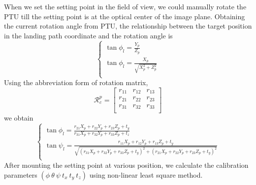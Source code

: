 \documentclass[journal,article,submit,moreauthors,pdftex,10pt,a4paper]{mdpi}
\begin{document}
When we set the setting point in the field of view, we could manually rotate the PTU till the setting point is at the optical center of the image plane. Obtaining the current rotation angle from PTU, the relationship between the target position in the landing path coordinate and the rotation angle is
\begin{equation}
\left\{ \begin{gathered}
\tan \phi_l = \frac{Y_p}{Z_p} \\
\tan \phi_l = \frac{X_p}{\sqrt{X_p^2+Z_p^2} }\\
\end{gathered}  \right.
\end{equation}
Using the abbreviation form of rotation matrix, 
\begin{equation}
\mathcal{R}_c^p = \begin{bmatrix}
r_{11} & r_{12} & r_{13}\\
r_{21} & r_{22} & r_{23}\\
r_{31} & r_{32} & r_{33}\\
\end{bmatrix}
\end{equation}
we obtain
\begin{equation}
\left\{ \begin{gathered}
\tan \phi_l= \frac{r_{21}X_p + r_{22}Y_p + r_{23}Z_p + t_y}{r_{31}X_p + r_{32}Y_p + r_{33}Z_p + t_z} \\
\tan \psi_l= \frac{r_{11}X_p + r_{12}Y_p + r_{13}Z_p + t_y}{\sqrt{(r_{31}X_p + r_{32}Y_p + r_{33}Z_p + t_y)^2+(r_{21}X_p + r_{22}Y_p + r_{23}Z_p + t_y)^2} }\\
\end{gathered}  \right.
\end{equation}
After mounting the setting point at various position, we calculate the calibration parameters $(\phi\ \theta\ \psi\ t_x\ t_y\ t_z)$ using non-linear least square method.
\end{document}

